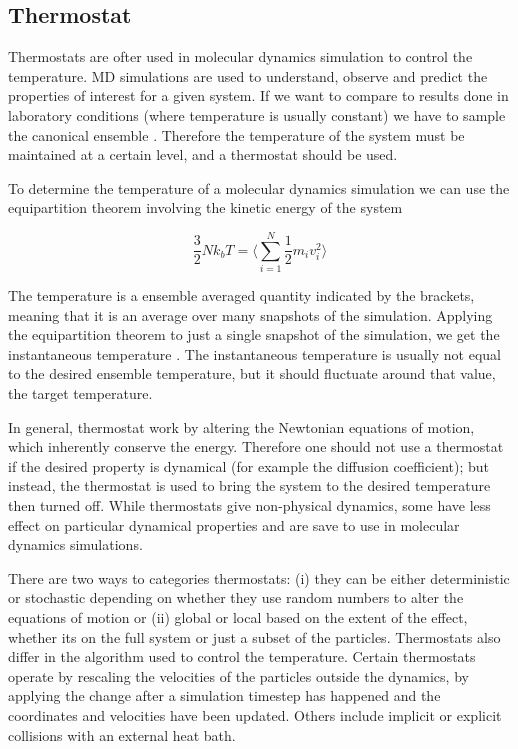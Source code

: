 \subsection{Thermostat}

Thermostats are ofter used in molecular dynamics simulation to control the temperature. MD simulations are used to understand, observe and predict the properties of interest for a given system. If we want to compare to results done in laboratory conditions (where temperature is usually constant) we have to sample the canonical ensemble \cite{hunenberger2005thermostat}. Therefore the temperature of the system must be maintained at a certain level, and a thermostat should be used.

To determine the temperature of a molecular dynamics simulation we can use the equipartition theorem involving the kinetic energy of the system

\begin{equation}
  \frac{3}{2} N k_b T = \langle \sum_{i=1}^{N} \frac{1}{2} m_i v_{i}^2 \rangle
\end{equation}

The temperature is a ensemble averaged quantity indicated by the brackets, meaning that it is an average over many snapshots of the simulation. Applying the equipartition theorem to just a single snapshot of the simulation, we get the instantaneous temperature \cite{zuckerman2010statistical, leach2001molecular}. The instantaneous temperature is usually not equal to the desired ensemble temperature, but it should fluctuate around that value, the target temperature.

In general, thermostat work by altering the Newtonian equations of motion, which inherently conserve the energy. Therefore one should not use a thermostat if the desired property is dynamical (for example the diffusion coefficient); but instead, the thermostat is used to bring the system to the desired temperature then turned off. While thermostats give non-physical dynamics, some have less effect on particular dynamical properties and are save to use in molecular dynamics simulations.

There are two ways to categories thermostats: (i) they can be either deterministic or stochastic depending on whether they use random numbers to alter the equations of motion or (ii) global or local based on the extent of the effect, whether its on the full system or just a subset of the particles. Thermostats also differ in the algorithm used to control the temperature. Certain thermostats operate by rescaling the velocities of the particles outside the dynamics, by applying the change after a simulation timestep has happened and the coordinates and velocities have been updated. Others include implicit or explicit collisions with an external heat bath.

